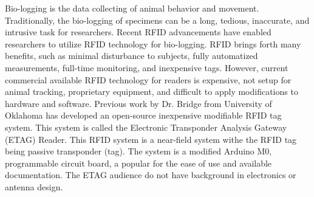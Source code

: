 Bio-logging is the data collecting of animal behavior and movement. Traditionally, the bio-logging of specimens can be a long, tedious, inaccurate, and intrusive task for researchers. Recent RFID advancements have enabled researchers to utilize RFID technology for bio-logging. RFID brings forth many benefits, such as minimal disturbance to subjects, fully automatized measurements, full-time monitoring, and inexpensive tags. However, current commercial available RFID technology for readers is expensive, not setup for animal tracking,  proprietary equipment, and difficult to apply modifications to hardware and software. Previous work by Dr. Bridge from University of Oklahoma has developed an open-source inexpensive modifiable RFID tag system. This system is called the Electronic Transponder Analysis Gateway (ETAG) Reader. This RFID system is a near-field system withe the RFID tag being passive transponder (tag). The system is a modified Arduino M0, programmable circuit board, a popular for the ease of use and available documentation. The ETAG audience do not have background in electronics or antenna design. 


%